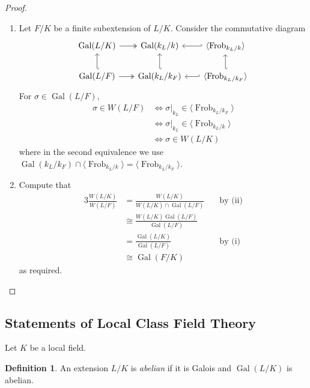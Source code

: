 \documentclass[11pt]{article}
\theoremstyle{definition}
\newtheorem{definition}{Definition}[subsection]
\theoremstyle{plain}
\theoremstyle{remark}
\DeclareMathOperator{\Gal}{Gal}
\DeclareMathOperator{\Frob}{Frob}
\begin{document}
\begin{proof}
\begin{enumerate}
        \item Let $F/K$ be a finite subextension of $L/K$. Consider the commutative diagram
            \begin{equation*}
                \begin{tikzcd}[column sep=scriptsize]
                \Gal(L/K) \arrow[r, twoheadrightarrow] \arrow[d, hookleftarrow] & \Gal(k_L/k) \arrow[r, hookleftarrow] \arrow[d, hookleftarrow] & \langle \Frob_{k_L/k} \arrow[d, hookleftarrow] \rangle\\
                \Gal(L/F) \arrow[r, twoheadrightarrow] & \Gal(k_L/k_F) \arrow[r, hookleftarrow] & \langle \Frob_{k_L/k_F} \rangle
            \end{tikzcd}
            \end{equation*}
            For $\sigma \in \Gal(L/F)$,
            \begin{align*}
                \sigma \in W(L/F)
                &\iff \sigma \vert_{k_L} \in \langle \Frob_{k_L/k_F} \rangle\\
                &\iff \sigma \vert_{k_L} \in \langle \Frob_{k_L/k} \rangle\\
                &\iff \sigma \in W(L/K)
            \end{align*}
            where in the second equivalence we use $\Gal(k_L/k_F) \cap \langle \Frob_{k_L/k} \rangle = \langle \Frob_{k_L/k_F} \rangle$.
        \item Compute that
            \begin{alignat*}{3}
                \frac{W(L/K)}{W(L/F)}
                &= \frac{W(L/K)}{W(L/K) \cap \Gal(L/F)} &\quad\text{by (ii)}\\
                &\cong \frac{W(L/K) \Gal(L/F)}{\Gal(L/F)}\\
                &= \frac{\Gal(L/K)}{\Gal(L/F)} &\quad\text{by (i)}\\
                &\cong \Gal(F/K)
            \end{alignat*}
            as required. \qedhere
    \end{enumerate}
\end{proof}

\subsection{Statements of Local Class Field Theory}

Let $K$ be a local field.

\begin{definition}\label{def:17_1}
    An extension $L/K$ is \emph{abelian} if it is Galois and $\Gal(L/K)$ is abelian.
\end{definition}
\end{document}
